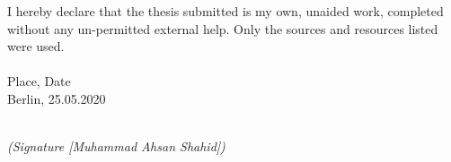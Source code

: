 \newpage

\thispagestyle{empty}

\begin{large}

\vspace*{6cm}

\noindent
I hereby declare that the thesis submitted is my own, unaided work, completed
without any un-permitted external help. Only the sources and resources listed were
used.
\\
\\

\noindent
Place, Date
\\

\noindent
Berlin, 25.05.2020

\vspace{3cm}

\hspace*{7cm}%
\dotfill\\
\hspace*{8.5cm}%
\textit{(Signature [Muhammad Ahsan Shahid])}

\end{large}
